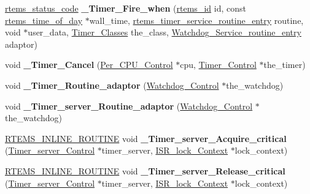 \begin{DoxyCompactItemize}
\mbox{\hyperlink{group__ClassicStatus_ga545d41846817eaba6143d52ee4d9e9fe}{rtems\+\_\+status\+\_\+code}} {\bfseries \+\_\+\+Timer\+\_\+\+Fire\+\_\+when} (\mbox{\hyperlink{group__ClassicTasks_gab20892b814dced7dd4e5b9bf42becd57}{rtems\+\_\+id}} id, const \mbox{\hyperlink{structrtems__time__of__day}{rtems\+\_\+time\+\_\+of\+\_\+day}} $\ast$wall\+\_\+time, \mbox{\hyperlink{group__ClassicTimer_gab7851346dd520066ddc58a25de671f51}{rtems\+\_\+timer\+\_\+service\+\_\+routine\+\_\+entry}} routine, void $\ast$user\+\_\+data, \mbox{\hyperlink{group__ClassicTimer_gaca88ac1e833f63ec72d38e07677f2f27}{Timer\+\_\+\+Classes}} the\+\_\+class, \mbox{\hyperlink{group__RTEMSScoreWatchdog_ga6ae5e52f6c4046535272c18a8cba66e1}{Watchdog\+\_\+\+Service\+\_\+routine\+\_\+entry}} adaptor)
\item 
\mbox{\label{group__ClassicTimerImpl_gad3cc9c58e403f6c6e7e53ab678d665f7}} 
void {\bfseries \+\_\+\+Timer\+\_\+\+Cancel} (\mbox{\hyperlink{structPer__CPU__Control}{Per\+\_\+\+C\+P\+U\+\_\+\+Control}} $\ast$cpu, \mbox{\hyperlink{structTimer__Control}{Timer\+\_\+\+Control}} $\ast$the\+\_\+timer)
\item 
\mbox{\label{group__ClassicTimerImpl_ga52566ddfc6c14e1f233c0dd0e83ed675}} 
void {\bfseries \+\_\+\+Timer\+\_\+\+Routine\+\_\+adaptor} (\mbox{\hyperlink{structWatchdog__Control}{Watchdog\+\_\+\+Control}} $\ast$the\+\_\+watchdog)
\item 
\mbox{\label{group__ClassicTimerImpl_ga4bebbb78a2e1f8a9b7ff99ea24b2da83}} 
void {\bfseries \+\_\+\+Timer\+\_\+server\+\_\+\+Routine\+\_\+adaptor} (\mbox{\hyperlink{structWatchdog__Control}{Watchdog\+\_\+\+Control}} $\ast$the\+\_\+watchdog)
\item 
\mbox{\label{group__ClassicTimerImpl_ga47a0d493165b8a0d10c85d1768041202}} 
\mbox{\hyperlink{group__RTEMSScoreBaseDefs_gac216239df231d5dbd15e3520b0b9313f}{R\+T\+E\+M\+S\+\_\+\+I\+N\+L\+I\+N\+E\+\_\+\+R\+O\+U\+T\+I\+NE}} void {\bfseries \+\_\+\+Timer\+\_\+server\+\_\+\+Acquire\+\_\+critical} (\mbox{\hyperlink{structTimer__server__Control}{Timer\+\_\+server\+\_\+\+Control}} $\ast$timer\+\_\+server, \mbox{\hyperlink{structISR__lock__Context}{I\+S\+R\+\_\+lock\+\_\+\+Context}} $\ast$lock\+\_\+context)
\item 
\mbox{\label{group__ClassicTimerImpl_ga2cba35074736e90029c84b81661d76d8}} 
\mbox{\hyperlink{group__RTEMSScoreBaseDefs_gac216239df231d5dbd15e3520b0b9313f}{R\+T\+E\+M\+S\+\_\+\+I\+N\+L\+I\+N\+E\+\_\+\+R\+O\+U\+T\+I\+NE}} void {\bfseries \+\_\+\+Timer\+\_\+server\+\_\+\+Release\+\_\+critical} (\mbox{\hyperlink{structTimer__server__Control}{Timer\+\_\+server\+\_\+\+Control}} $\ast$timer\+\_\+server, \mbox{\hyperlink{structISR__lock__Context}{I\+S\+R\+\_\+lock\+\_\+\+Context}} $\ast$lock\+\_\+context)
\end{DoxyCompactItemize}
